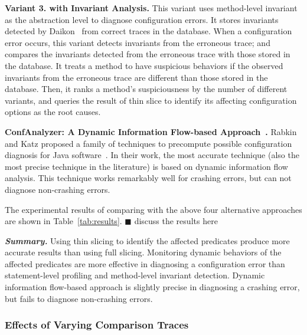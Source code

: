 \vspace{1mm}
\noindent \textbf{Variant 3. \ourtool with Invariant Analysis.}
This variant uses method-level invariant as the abstraction level
to diagnose configuration errors. It stores invariants detected
by Daikon~\cite{Ernst:1999} from correct traces in the database. When a configuration
error occurs, this variant detects invariants from the erroneous trace;
and compares the invariants detected from
the erroneous trace with those stored in the database.
It treats a method to have suspicious behaviors if the observed invariants
from the erroneous trace are different than those stored in the database. Then, it ranks
a method's suspiciousness by the number of different variants, and
queries the result of thin slice
to identify its affecting configuration options as the root causes. 

\vspace{1mm}
\noindent \textbf{ConfAnalyzer: A Dynamic Information Flow-based Approach~\cite{Rabkin:2011:PPC}.}
Rabkin and Katz proposed a family of techniques to precompute possible
configuration diagnosis for Java software~\cite{Rabkin:2011:PPC}. In their work,
the most accurate technique (also the most precise technique in the literature)
is based on dynamic information flow analysis.
This technique works remarkably well for crashing errors, but can
not diagnose non-crashing errors.

\vspace{1mm}

The experimental results of comparing \ourtool with the above
four alternative approaches are shown in Table~\ref{tab:results}.
$\blacksquare$ discuss the results here

\vspace{1mm}
\noindent \textbf{\textit{Summary.}} Using thin slicing to identify
the affected predicates produce more accurate results than using
full slicing. Monitoring dynamic behaviors of the affected
predicates are more effective in diagnosing a configuration error
than statement-level profiling and method-level invariant detection.
Dynamic information flow-based approach is slightly precise in diagnosing
a crashing error, but fails to diagnose non-crashing errors.

\subsubsection{Effects of Varying Comparison Traces}
\label{sec:ranking}


